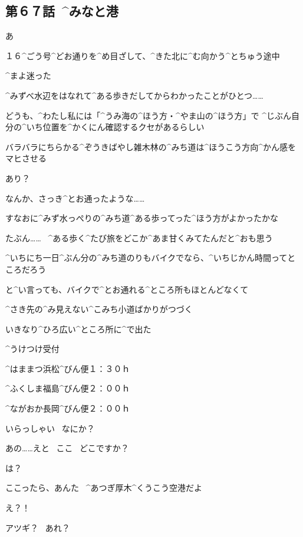 \subsection{第６７話\ ^{みなと}{港}}

\page[20]
\Alpha あ

\Alpha １６^{ごう}{号}^{どお}{通}りを^{め}{目}ざして、^{きた}{北}に^{む}{向}かう^{とちゅう}{途中}

\Alpha ^{まよ}{迷}った

\page
\Alpha ^{みずべ}{水辺}をはなれて^{ある}{歩}きだしてからわかったことがひとつ……

\Alpha どうも、^{わたし}{私}には「^{うみ}{海}の^{ほう}{方}・^{やま}{山}の^{ほう}{方}」で
^{じぶん}{自分}の^{いち}{位置}を^{かくにん}{確認}するクセがあるらしい

\Alpha バラバラにちらかる^{ぞうきばやし}{雑木林}の^{みち}{道}は^{ほうこう}{方向}^{かん}{感}をマヒさせる

\page
\Alpha あり？

\Alpha なんか、さっき^{とお}{通}ったような……

\Alpha すなおに^{みず}{水}っぺりの^{みち}{道}^{ある}{歩}ってった^{ほう}{方}がよかったかな

\page
\Alpha たぶん……
\ ^{ある}{歩}く^{たび}{旅}をどこか^{あま}{甘}くみてたんだと^{おも}{思}う

\Alpha ^{いちにち}{一日}^{ぶん}{分}の^{みち}{道}のりもバイクでなら、^{いちじかん}{時間}ってところだろう

\page
\Alpha と^{い}{言}っても、バイクで^{とお}{通}れる^{ところ}{所}もほとんどなくて

\Alpha ^{さき}{先}の^{み}{見}えない^{こみち}{小道}ばかりがつづく

\page[29]
\Alpha いきなり^{ひろ}{広}い^{ところ}{所}に^{で}{出}た

\page
\Sign ^{うけつけ}{受付}

\Sign ^{はままつ}{浜松}^{びん}{便}１：３０ｈ

\Sign ^{ふくしま}{福島}^{びん}{便}２：００ｈ

\Sign ^{ながおか}{長岡}^{びん}{便}２：００ｈ

\Person いらっしゃい
\ なにか？

\Alpha あの……えと
\ ここ
\ どこですか？

\Person は？

\page
\Person ここったら、あんた
\ ^{あつぎ}{厚木}^{くうこう}{空港}だよ

\Alpha え？！

\Alpha アツギ？
\ あれ？

